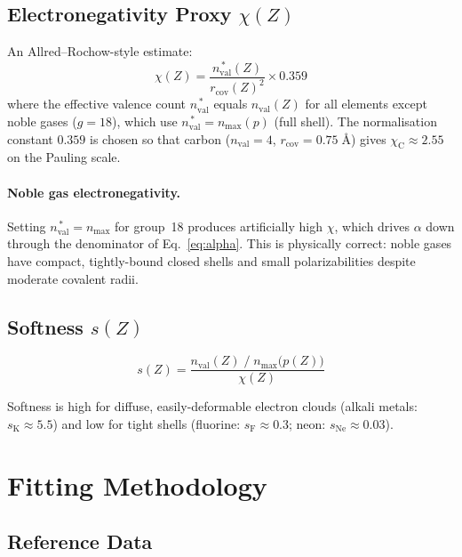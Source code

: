 \documentclass[11pt,letterpaper]{article}
\newcommand{\rcov}{r_{\mathrm{cov}}}
\newcommand{\nval}{n_{\mathrm{val}}}
\newcommand{\nmax}{n_{\mathrm{max}}}
\newcommand{\Ang}{\text{\AA}}
\begin{document}
\subsection{Electronegativity Proxy $\chi(Z)$}
\label{sec:chi}

An Allred--Rochow-style estimate:
\begin{equation}
\chi(Z) = \frac{\nval^{\,\ast}(Z)}{\rcov(Z)^2} \times 0.359
\label{eq:chi}
\end{equation}
where the effective valence count $\nval^{\,\ast}$ equals $\nval(Z)$
for all elements except noble gases ($g=18$), which use
$\nval^{\,\ast} = \nmax(p)$ (full shell).  The normalisation constant
$0.359$ is chosen so that carbon ($\nval = 4$, $\rcov = 0.75\;\Ang$)
gives $\chi_{\mathrm{C}} \approx 2.55$ on the Pauling scale.

\paragraph{Noble gas electronegativity.}
Setting $\nval^{\,\ast} = \nmax$ for group~18 produces artificially high
$\chi$, which drives $\alpha$ down through the denominator of
Eq.~\eqref{eq:alpha}.  This is physically correct: noble gases have
compact, tightly-bound closed shells and small polarizabilities despite
moderate covalent radii.

\subsection{Softness $s(Z)$}
\label{sec:soft}

\begin{equation}
s(Z) = \frac{\nval(Z)\;/\;\nmax\bigl(p(Z)\bigr)}{\chi(Z)}
\label{eq:soft}
\end{equation}

Softness is high for diffuse, easily-deformable electron clouds (alkali
metals: $s_{\mathrm{K}} \approx 5.5$) and low for tight shells (fluorine:
$s_{\mathrm{F}} \approx 0.3$; neon: $s_{\mathrm{Ne}} \approx 0.03$).

\section{Fitting Methodology}
\label{sec:fitting}

\subsection{Reference Data}
\end{document}
